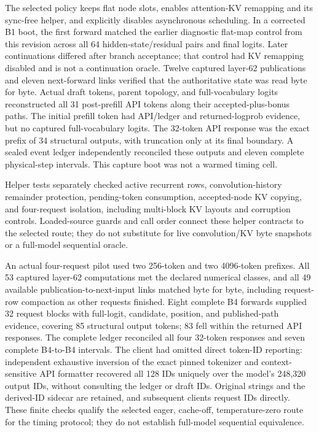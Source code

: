 \documentclass[conference]{IEEEtran}
\begin{document}
The selected policy keeps flat node slots, enables attention-KV remapping and its sync-free helper, and explicitly disables asynchronous scheduling. In a corrected B1 boot, the first forward matched the earlier diagnostic flat-map control from this revision across all 64 hidden-state/residual pairs and final logits. Later continuations differed after branch acceptance; that control had KV remapping disabled and is not a continuation oracle. Twelve captured layer-62 publications and eleven next-forward links verified that the authoritative state was read byte for byte. Actual draft tokens, parent topology, and full-vocabulary logits reconstructed all 31 post-prefill API tokens along their accepted-plus-bonus paths. The initial prefill token had API/ledger and returned-logprob evidence, but no captured full-vocabulary logits. The 32-token API response was the exact prefix of 34 structural outputs, with truncation only at its final boundary. A sealed event ledger independently reconciled these outputs and eleven complete physical-step intervals. This capture boot was not a warmed timing cell.

Helper tests separately checked active recurrent rows, convolution-history remainder protection, pending-token consumption, accepted-node KV copying, and four-request isolation, including multi-block KV layouts and corruption controls. Loaded-source guards and call order connect these helper contracts to the selected route; they do not substitute for live convolution/KV byte snapshots or a full-model sequential oracle.

An actual four-request pilot used two 256-token and two 4096-token prefixes. All 53 captured layer-62 computations met the declared numerical classes, and all 49 available publication-to-next-input links matched byte for byte, including request-row compaction as other requests finished. Eight complete B4 forwards supplied 32 request blocks with full-logit, candidate, position, and published-path evidence, covering 85 structural output tokens; 83 fell within the returned API responses. The complete ledger reconciled all four 32-token responses and seven complete B4-to-B4 intervals. The client had omitted direct token-ID reporting: independent exhaustive inversion of the exact pinned tokenizer and context-sensitive API formatter recovered all 128 IDs uniquely over the model's 248,320 output IDs, without consulting the ledger or draft IDs. Original strings and the derived-ID sidecar are retained, and subsequent clients request IDs directly. These finite checks qualify the selected eager, cache-off, temperature-zero route for the timing protocol; they do not establish full-model sequential equivalence.
\end{document}
